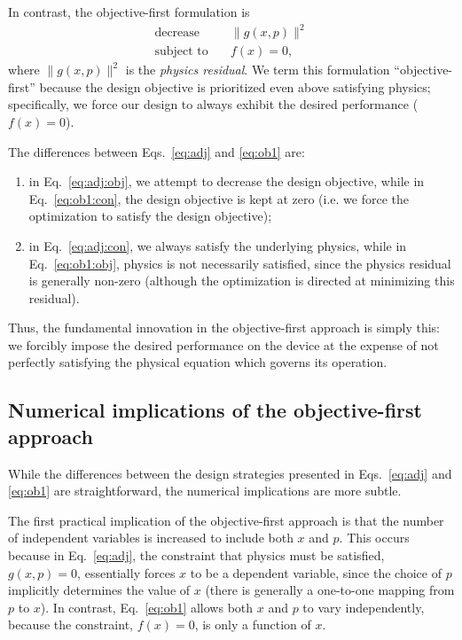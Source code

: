 \documentclass[letterpaper,10pt]{article}
\begin{document}
In contrast, the objective-first formulation is
    \begin{subequations}\label{eq:ob1}
    \begin{align} 
    \text{decrease} & \quad \|g(x,p)\|^2 \label{eq:ob1:obj} \\ 
    \text{subject to} & \quad f(x) = 0, \label{eq:ob1:con}
    \end{align}
    \end{subequations}
    where $\|g(x,p)\|^2$ is the \emph{physics residual}.
We term this formulation ``objective-first''
    because the design objective is prioritized even above satisfying physics;
    specifically, we force our design to always exhibit the desired performance
    ($f(x) = 0$).

The differences between Eqs.~\ref{eq:adj} and \ref{eq:ob1} are:
\begin{enumerate}
    \item in Eq.~\ref{eq:adj:obj}, we attempt to decrease the design objective,
        while in Eq.~\ref{eq:ob1:con}, the design objective is kept at zero
        (i.e. we force the optimization to satisfy the design objective);
    \item in Eq.~\ref{eq:adj:con}, we always satisfy the underlying physics,
        while in Eq.~\ref{eq:ob1:obj}, physics is not necessarily satisfied,
            since the physics residual is generally non-zero
            (although the optimization is directed at minimizing this residual).
\end{enumerate}

Thus, the fundamental innovation in the objective-first approach
    is simply this:
    we forcibly impose the desired performance on the device at the expense of
    not perfectly satisfying the physical equation which governs its operation.

\subsection{Numerical implications of the objective-first approach}

While the differences between the design strategies presented in 
    Eqs.~\ref{eq:adj} and \ref{eq:ob1} are straightforward,
    the numerical implications are more subtle.

The first practical implication of the objective-first approach 
    is that the number of independent variables is increased to include
    both $x$ and $p$.
This occurs because in Eq.~\ref{eq:adj}, 
    the constraint that physics must be satisfied, $g(x,p)=0$, 
    essentially forces $x$ to be a dependent variable,
    since the choice of $p$ implicitly determines the value of $x$
    (there is generally a one-to-one mapping from $p$ to $x$).
In contrast, Eq.~\ref{eq:ob1} allows both $x$ and $p$ to vary independently,
    because the constraint, $f(x)=0$, is only a function of $x$.
\end{document}
